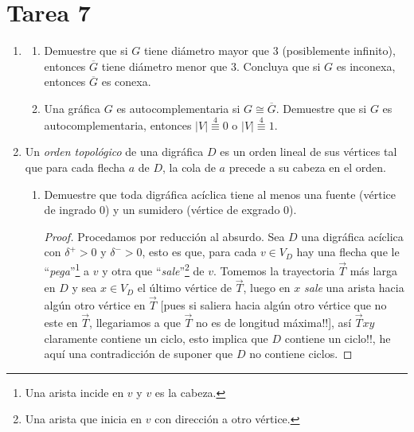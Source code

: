 \documentclass{article}
\begin{document}
\section*{\LARGE{Tarea 7}}
\begin{enumerate}
\item \begin{enumerate}
\item Demuestre que si $G$ tiene di\'ametro mayor que $3$ (posiblemente
  infinito), entonces $\overline{G}$ tiene di\'ametro menor que $3$.
  Concluya que si $G$ es inconexa, entonces $\overline{G}$ es conexa.
\item Una gr\'afica $G$ es autocomplementaria si $G \cong \overline{G}$.
  Demuestre que si $G$ es autocomplementaria, entonces $|V|
  \stackrel{4}{\equiv} 0$ o $|V| \stackrel{4}{\equiv} 1$.
\end{enumerate}
\item Un {\em orden topol\'ogico} de una digr\'afica $D$ es un orden lineal de
  sus v\'ertices tal que para cada flecha $a$ de $D$, la cola de $a$ precede a
  su cabeza en el orden.
  \begin{enumerate}
  \item Demuestre que toda digr\'afica ac\'iclica tiene al menos una fuente
    (v\'ertice de ingrado $0$) y un sumidero (v\'ertice de exgrado $0$).
    \begin{proof}
      Procedamos por reducci\'on al absurdo. Sea $D$ una digr\'afica ac\'iclica
      con $\delta^+ > 0$ y $\delta^- > 0$, esto es que, para cada $v \in V_D$ hay
      una flecha que le ``\textit{pega}''\footnote{Una arista incide en $v$ y $v$
        es la cabeza.} a $v$ y otra que ``\textit{sale}''\footnote{Una arista que
        inicia en $v$ con direcci\'on a otro v\'ertice.} de $v$. Tomemos la
      trayectoria $\vec{T}$ m\'as larga en $D$ y sea $x \in V_D$ el \'ultimo
      v\'ertice de $\vec{T}$, luego en $x$ \textit{sale} una arista hacia alg\'un
      otro v\'ertice en $\vec{T}$ [pues si saliera hacia alg\'un otro v\'ertice que
        no este en $\vec{T}$, llegariamos a que $\vec{T}$ no es de longitud m\'axima!!],
      as\'i $\vec{T}xy$ claramente contiene un ciclo, esto implica que $D$ contiene
      un ciclo!!, he aqu\'i una contradicci\'on de suponer que $D$ no contiene ciclos.


\end{proof}
\end{enumerate}
\end{enumerate}
\end{document}
